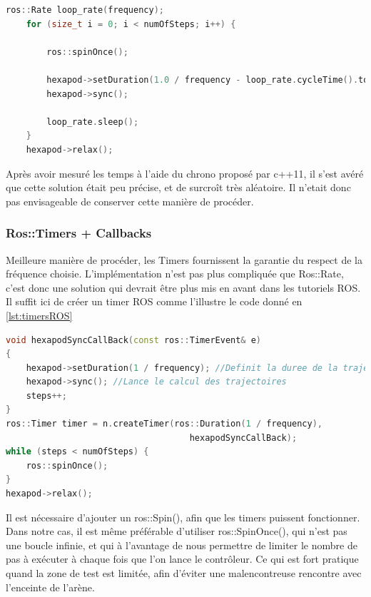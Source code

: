 \documentclass{tnreport}
\begin{document}
\begin{lstlisting}[language=c++,caption={Implémentation de Ros::Rate sous \gls{ROS}}, label={lst:rateROS}]
    ros::Rate loop_rate(frequency);
    for (size_t i = 0; i < numOfSteps; i++) {

        ros::spinOnce();

        hexapod->setDuration(1.0 / frequency - loop_rate.cycleTime().toSec());
        hexapod->sync();

        loop_rate.sleep();
    }
    hexapod->relax();
\end{lstlisting}
Après avoir mesuré les temps à l'aide du chrono proposé par c++11, il s'est avéré que cette solution était peu précise, et de surcroît très aléatoire. Il n'etait donc pas envisageable de conserver cette manière de procéder. 

\subsubsection{Ros::Timers + Callbacks}
Meilleure manière de procéder, les Timers fournissent la garantie du respect de la fréquence choisie. L'implémentation n'est pas plus compliquée que Ros::Rate, c'est donc une solution qui devrait être plus mis en avant dans les tutoriels \gls{ROS}. Il suffit ici de créer un timer \gls{ROS} comme l'illustre le code donné en \ref{lst:timersROS}
\newpage
\begin{lstlisting}[language=c++,caption={Implémentation des Timers sous \gls{ROS}}, label={lst:timersROS}]
void hexapodSyncCallBack(const ros::TimerEvent& e)
{
    hexapod->setDuration(1 / frequency); //Definit la duree de la trajectoire
    hexapod->sync(); //Lance le calcul des trajectoires 
    steps++;
}
ros::Timer timer = n.createTimer(ros::Duration(1 / frequency), 
                                    hexapodSyncCallBack);
while (steps < numOfSteps) {
    ros::spinOnce();
}
hexapod->relax();
\end{lstlisting}
Il est nécessaire d'ajouter un ros::Spin(), afin que les timers puissent fonctionner. Dans notre cas, il est même préférable d'utiliser ros::SpinOnce(), qui n'est pas une boucle infinie, et qui à l'avantage de nous permettre de limiter le nombre de pas à exécuter à chaque fois que l'on lance le contrôleur. Ce qui est fort pratique quand la zone de test est limitée, afin d'éviter une malencontreuse rencontre avec l'enceinte de l'arène. 

\newpage
\end{document}
